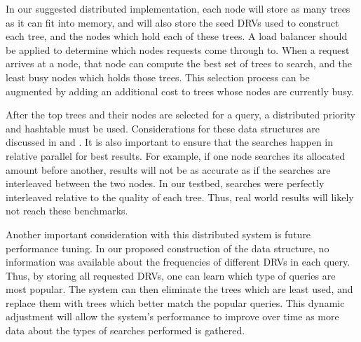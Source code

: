 In our suggested distributed implementation, each node will store as many trees as it can fit into memory, and will also store the seed DRVs used to construct each tree, and the nodes which hold each of these trees.  A load balancer should be applied to determine which nodes requests come through to.  When a request arrives at a node, that node can compute the best set of trees to search, and the least busy nodes which holds those trees.  This selection process can be augmented by adding an additional cost to trees whose nodes are currently busy.

After the top trees and their nodes are selected for a query, a distributed priority and hashtable must be used.  Considerations for these data structures are discussed in \citep{kaashoek2003koorde} and \citep{rogers1995supporting}.  It is also important to ensure that the searches happen in relative parallel for best results.  For example, if one node searches its allocated amount before another, results will not be as accurate as if the searches are interleaved between the two nodes.  In our testbed, searches were perfectly interleaved relative to the quality of each tree.  Thus, real world results will likely not reach these benchmarks.

Another important consideration with this distributed system is future performance tuning.  In our proposed construction of the data structure, no information was available about the frequencies of different DRVs in each query.  Thus, by storing all requested DRVs, one can learn which type of queries are most popular.  The system can then eliminate the trees which are least used, and replace them with trees which better match the popular queries.  This dynamic adjustment will allow the system's performance to improve over time as more data about the types of searches performed is gathered.